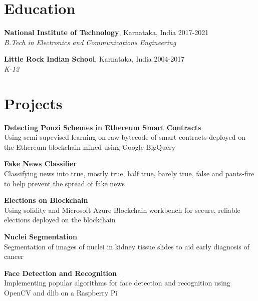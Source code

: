 \documentclass[margin]{res}
\begin{document}
  \address{National Institute of Technology\\Karnataka, India\\linkedin/in/rshwndsz}
  \address{(91+) 9611212081\\russel.171ec143@nitk.edu.in\\github.com/rshwndsz}

  \begin{resume}
    \section{Education}
      \textbf{National Institute of Technology}, Karnataka, India\hfill 
      2017-2021
      \\
      {\sl B.Tech in Electronics and Communications Engineering}\hfill 
      

      \textbf{Little Rock Indian School}, Karnataka, India\hfill
      2004-2017
      \\
      {\sl K-12}\hfill

    \section{Projects}
      \par
      \textbf{Detecting Ponzi Schemes in Ethereum Smart Contracts}\\
      Using semi-supevised learning on raw bytecode of smart contracts deployed on the Ethereum blockchain mined using Google BigQuery

      \par
      \textbf{Fake News Classifier}\\
      Classifying news into true, mostly true, half true, barely true, false and pants-fire to help prevent the spread of fake news

      \par
      \textbf{Elections on Blockchain}\\
      Using solidity and Microsoft Azure Blockchain workbench for secure, reliable elections deployed on the blockchain

      \par
      \textbf{Nuclei Segmentation}\\
      Segmentation of images of nuclei in kidney tissue slides to aid early diagnosis of cancer

      \par
      \textbf{Face Detection and Recognition}\\
      Implementing popular algorithms for face detection and recognition using OpenCV and dlib on a Raspberry Pi


\end{resume}
\end{document}
